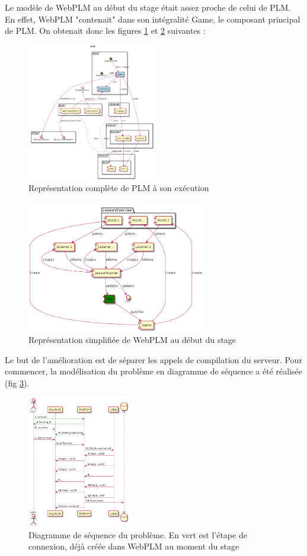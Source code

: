 \documentclass[stage]{tnreport}
\begin{document}
Le modèle de WebPLM au début du stage était assez proche de celui de PLM. En effet, WebPLM "contenait" dans son intégralité Game, le composant principal de PLM. On obtenait donc les figures \ref{fig:plmUP1} et \ref{fig:wplmUP1} suivantes :
\begin{figure}[h]
	\centering
		\includegraphics[width=0.5\textwidth]{figures/PLM-uml-cp1}
	\caption{Représentation complète de PLM à son exécution}
	\label{fig:plmUP1}
\end{figure}
\begin{figure}[h]
	\centering
		\includegraphics[width=0.7\textwidth]{figures/WebPLM-uml-cp1}
	\caption{Représentation simplifiée de WebPLM au début du stage}
	\label{fig:wplmUP1}
\end{figure}

Le but de l'amélioration est de séparer les appels de compilation du serveur. Pour commencer, la modélisation du problème en diagramme de séquence a été réalisée (fig \ref{fig:wplmUS1}).
\begin{figure}[h]
	\centering
		\includegraphics[width=0.4\textwidth]{figures/WebPLM-uml-Seq1}
	\caption{Diagramme de séquence du problème. En vert est l'étape de connexion, déjà créée dans WebPLM au moment du stage}
	\label{fig:wplmUS1}
\end{figure}
\end{document}
